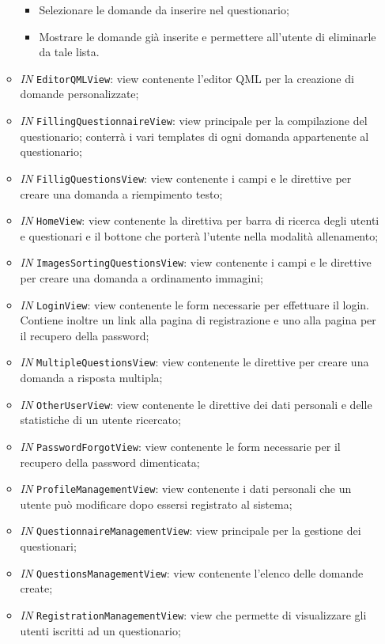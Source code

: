 \begin{itemize}
\begin{itemize}
\begin{itemize}
				\item Selezionare le domande da inserire nel questionario;
				\item Mostrare le domande già inserite e permettere all'utente di eliminarle da tale lista.
			\end{itemize}
			\item \textit{IN} \texttt{EditorQMLView}: view contenente l'editor QML per la creazione di domande personalizzate;
			\item \textit{IN} \texttt{FillingQuestionnaireView}: view principale per la compilazione del questionario; conterrà i vari templates di ogni domanda appartenente al questionario;
			\item \textit{IN} \texttt{FilligQuestionsView}: view contenente i campi e le direttive per creare una domanda a riempimento testo;
			\item \textit{IN} \texttt{HomeView}: view contenente la direttiva per barra di ricerca degli utenti e questionari e il bottone che porterà l'utente nella modalità allenamento;
			\item \textit{IN} \texttt{ImagesSortingQuestionsView}: view contenente i campi e le direttive per creare una domanda a ordinamento immagini;
			\item \textit{IN} \texttt{LoginView}: view contenente le form necessarie per effettuare il login. Contiene inoltre un link alla pagina di registrazione e uno alla pagina per il recupero della password;
			\item \textit{IN} \texttt{MultipleQuestionsView}: view contenente le direttive per creare una domanda a risposta multipla;
			\item \textit{IN} \texttt{OtherUserView}: view contenente le direttive dei dati personali e delle statistiche di un utente ricercato;
			\item \textit{IN} \texttt{PasswordForgotView}: view contenente le form necessarie per il recupero della password dimenticata; 
			\item \textit{IN} \texttt{ProfileManagementView}: view contenente i dati personali che un utente può modificare dopo essersi registrato al sistema;
			\item \textit{IN} \texttt{QuestionnaireManagementView}:  view principale per la gestione dei questionari;
			\item \textit{IN} \texttt{QuestionsManagementView}: view contenente l'elenco delle domande create; 
			\item \textit{IN} \texttt{RegistrationManagementView}: view che permette di visualizzare gli utenti iscritti ad un questionario;

\end{itemize}
\end{itemize}
